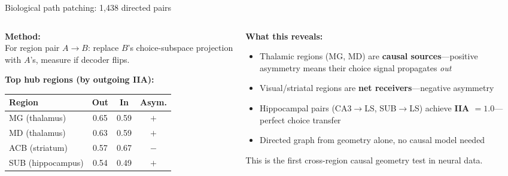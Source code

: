 \documentclass[aspectratio=169,11pt]{beamer}
\begin{document}
\begin{frame}{Biological path patching: 1,438 directed pairs}
\begin{columns}[T]
\begin{column}{0.48\textwidth}
\textbf{Method:}\\[0.2em]
{\small For region pair $A \to B$: replace $B$'s choice-subspace projection with $A$'s, measure if decoder flips.}

\vspace{0.3em}
\textbf{Top hub regions (by outgoing IIA):}\\[0.2em]
{\scriptsize
\begin{tabular}{lccc}
\toprule
\textbf{Region} & \textbf{Out} & \textbf{In} & \textbf{Asym.} \\
\midrule
MG (thalamus) & 0.65 & 0.59 & $+$ \\
MD (thalamus) & 0.63 & 0.59 & $+$ \\
ACB (striatum) & 0.57 & 0.67 & $-$ \\
SUB (hippocampus) & 0.54 & 0.49 & $+$ \\
\bottomrule
\end{tabular}
}
\end{column}
\begin{column}{0.50\textwidth}
\textbf{What this reveals:}\\[0.3em]
{\small
\begin{itemize}\setlength\itemsep{3pt}
  \item Thalamic regions (MG, MD) are \textbf{causal sources}---positive asymmetry means their choice signal propagates \emph{out}
  \item Visual/striatal regions are \textbf{net receivers}---negative asymmetry
  \item Hippocampal pairs (CA3$\to$LS, SUB$\to$LS) achieve \textbf{IIA $= 1.0$}---perfect choice transfer
  \item Directed graph from geometry alone, no causal model needed
\end{itemize}
}

\vspace{0.3em}
{\small This is the first cross-region causal geometry test in neural data.}
\end{column}
\end{columns}
\end{frame}
\end{document}
